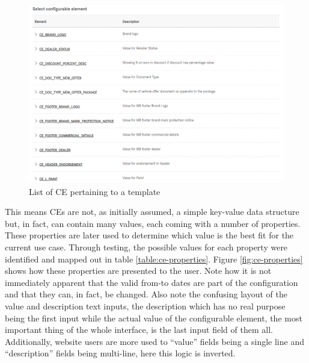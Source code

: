 \begin{figure}
  \centering
  \includegraphics[width=0.75\linewidth]{assets/pos-ce-config-2.png}
  \caption{List of CE pertaining to a template}
  \label{fig:pos:c}
\end{figure}

This means CEs are not, as initially assumed, a simple key-value data structure but, in fact, can contain many values, each coming with a number of properties. These properties are later used to determine which value is the best fit for the current use case. Through testing, the possible values for each property were identified and mapped out in table \ref{table:ce-properties}. Figure \ref{fig:ce-properties} shows how these properties are presented to the user. Note how it is not immediately apparent that the valid from-to dates are part of the configuration and that they can, in fact, be changed. Also note the confusing layout of the value and description text inputs, the description which has no real purpose being the first input while the actual value of the configurable element, the most important thing of the whole interface, is the last input field of them all. Additionally, website users are more used to ``value'' fields being a single line and ``description'' fields being multi-line, here this logic is inverted.

